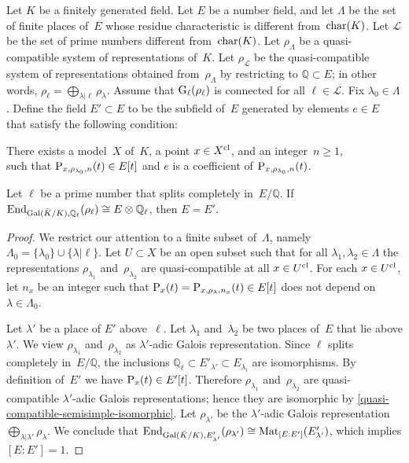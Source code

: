 \documentclass[10pt,twoside,leqno]{article}
\numberwithin{equation}{subsection}
\newcommand{\End}{\textnormal{End}}
\newcommand{\Mat}{\textnormal{Mat}}
\newcommand{\QQ}{\mathbb{Q}}
\newcommand{\QQl}{\QQ_{\ell}}
\newcommand{\primes}{\mathscr{L}}
\newcommand{\Gal}{\textnormal{Gal}}
\newcommand{\cl}{\textnormal{cl}}
\newcommand{\GG}{\textnormal{G}}
\newcommand{\Gl}{\GG_{\ell}}
\newcommand{\chrc}{\textnormal{char}}
\begin{document}
\begin{proposition} %
 \label{recover-endomorphisms}
 Let $K$ be a finitely generated field.
 Let $E$ be a number field,
 and let $\Lambda$ be the set of finite places of~$E$
 whose residue characteristic is different from~$\chrc(K)$.
 \def\primes{\mathscr{L}}%
 Let $\primes$ be the set of prime numbers different from~$\chrc(K)$.
 Let $\rho_\Lambda$ be a quasi-compatible system of representations of~$K$.
 Let $\rho_\primes$ be the quasi-compatible system of representations
obtained from~$\rho_\Lambda$ by restricting to $\QQ \subset E$;
 in other words, $\rho_\ell = \bigoplus_{\lambda | \ell} \rho_\lambda$.
 Assume that $\Gl(\rho_\ell)$ is connected for all $\ell \in \primes$.
 Fix $\lambda_0 \in \Lambda$.
 Define the field $E' \subset E$ to be the
 subfield of~$E$ generated by elements $e \in E$
 that satisfy the following condition:

 {\narrower\noindent
  There exists a model~$X$ of~$K$,
  a point $x \in X^\cl$,
  and an integer~$n \ge 1$,\\
  such that $\mathrm{P}_{x,\rho_{\lambda_0},n}(t) \in E[t]$
  and $e$ is a coefficient of $\mathrm{P}_{x,\rho_{\lambda_0},n}(t)$.
  \par}

 \noindent
 Let $\ell$ be a prime number that splits completely in~$E/\QQ$.
 If $\End_{\Gal(\bar{K}/K),\QQl}(\rho_\ell) \cong E \otimes \QQl$,
 then $E = E'$.
 \begin{proof}
  We restrict our attention to a finite subset of~$\Lambda$,
  namely $\Lambda_0 = \{\lambda_0\} \cup \{ \lambda | \ell \}$.
  Let $U \subset X$ be an open subset such that
  for all $\lambda_1, \lambda_2 \in \Lambda$
  the representations
  $\rho_{\lambda_1}$ and~$\rho_{\lambda_2}$
  are quasi-compatible at all $x \in U^\cl$.
  For each $x \in U^\cl$,
  let $n_x$ be an integer such that
  $\mathrm{P}_x(t) = \mathrm{P}_{x,\rho_\lambda,n_x}(t) \in E[t]$
  does not depend on $\lambda \in \Lambda_0$.

  Let $\lambda'$ be a place of $E'$ above~$\ell$.
  Let $\lambda_1$ and~$\lambda_2$ be two places
  of~$E$ that lie above $\lambda'$.
  We view $\rho_{\lambda_1}$ and~$\rho_{\lambda_2}$
  as $\lambda'$-adic Galois representation.
  Since $\ell$ splits completely in~$E/\QQ$,
  the inclusions $\QQl \subset E'_{\lambda'} \subset E_{\lambda_i}$
  are isomorphisms.
  By definition of~$E'$ we have $\mathrm{P}_x(t) \in E'[t]$.
  Therefore $\rho_{\lambda_1}$ and~$\rho_{\lambda_2}$
  are quasi-compatible $\lambda'$-adic Galois representations;
  hence they are isomorphic by \cref{quasi-compatible-semisimple-isomorphic}.
  Let $\rho_{\lambda'}$ be the $\lambda'$-adic Galois representation
  $\bigoplus_{\lambda | \lambda'} \rho_\lambda$.
  We conclude that
  $\End_{\Gal(\bar{K}/K),E'_{\lambda'}}(\rho_{\lambda'})
   \cong \Mat_{[E:E']}(E'_{\lambda'})$,
  which implies $[E:E'] = 1$.
 \end{proof}
\end{proposition}
\end{document}
